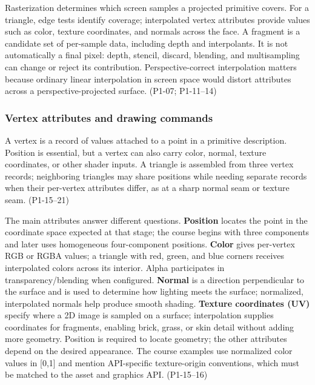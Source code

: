 Rasterization determines which screen samples a projected primitive covers. For a triangle, edge tests identify coverage; interpolated vertex attributes provide values such as color, texture coordinates, and normals across the face. A fragment is a candidate set of per-sample data, including depth and interpolants. It is not automatically a final pixel: depth, stencil, discard, blending, and multisampling can change or reject its contribution. Perspective-correct interpolation matters because ordinary linear interpolation in screen space would distort attributes across a perspective-projected surface. (P1-07; P1-11--14)

\subsubsection{Vertex attributes and drawing commands}\label{03-visual-computing-i-ch018-vertex-attributes-and-drawing-commands}

\hypertarget{03-visual-computing-i-ch018-vertex-attributes-and-drawing-commands}{}

A vertex is a record of values attached to a point in a primitive description. Position is essential, but a vertex can also carry color, normal, texture coordinates, or other shader inputs. A triangle is assembled from three vertex records; neighboring triangles may share positions while needing separate records when their per-vertex attributes differ, as at a sharp normal seam or texture seam. (P1-15--21)

The main attributes answer different questions. \textbf{Position} locates the point in the coordinate space expected at that stage; the course begins with three components and later uses homogeneous four-component positions. \textbf{Color} gives per-vertex RGB or RGBA values; a triangle with red, green, and blue corners receives interpolated colors across its interior. Alpha participates in transparency/blending when configured. \textbf{Normal} is a direction perpendicular to the surface and is used to determine how lighting meets the surface; normalized, interpolated normals help produce smooth shading. \textbf{Texture coordinates (UV)} specify where a 2D image is sampled on a surface; interpolation supplies coordinates for fragments, enabling brick, grass, or skin detail without adding more geometry. Position is required to locate geometry; the other attributes depend on the desired appearance. The course examples use normalized color values in {[}0,1{]} and mention API-specific texture-origin conventions, which must be matched to the asset and graphics API. (P1-15--16)

